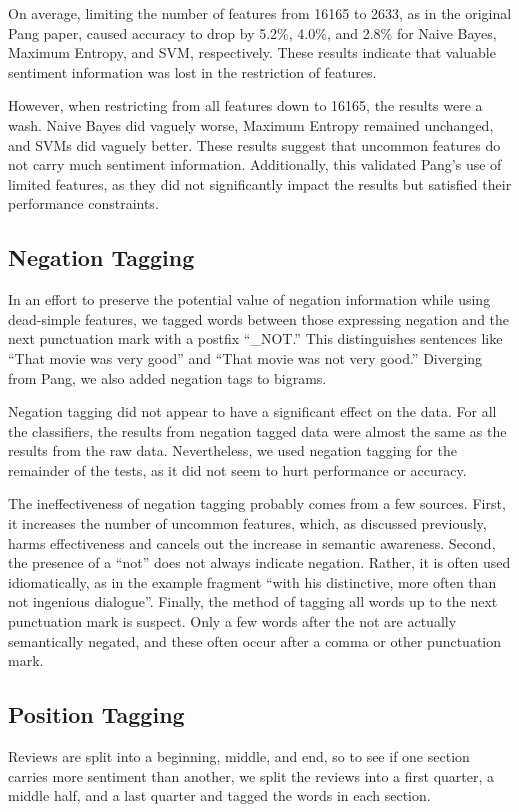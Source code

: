 \documentclass[10pt,twocolumn,letterpaper]{article}
\begin{document}
On average, limiting the number of features from 16165 to 2633, as in the original Pang paper, caused accuracy to drop by 5.2\%, 4.0\%, and 2.8\% for Naive Bayes, Maximum Entropy, and SVM, respectively. These results indicate that valuable sentiment information was lost in the restriction of features. 

However, when restricting from all features down to 16165, the results were a wash. Naive Bayes did vaguely worse, Maximum Entropy remained unchanged, and SVMs did vaguely better. These results suggest that uncommon features do not carry much sentiment information. Additionally, this validated Pang's use of limited features, as they did not significantly impact the results but satisfied their performance constraints.

\subsection{Negation Tagging}

In an effort to preserve the potential value of negation information while using dead-simple features, we tagged words between those expressing negation and the next punctuation mark with a postfix ``\_NOT.'' This distinguishes sentences like ``That movie was very good'' and ``That movie was not very good.'' Diverging from Pang, we also added negation tags to bigrams.

Negation tagging did not appear to have a significant effect on the data. For all the classifiers, the results from negation tagged data were almost the same as the results from the raw data. Nevertheless, we used negation tagging for the remainder of the tests, as it did not seem to hurt performance or accuracy. 

The ineffectiveness of negation tagging probably comes from a few sources. First, it increases the number of uncommon features, which, as discussed previously, harms effectiveness and cancels out the increase in semantic awareness. Second, the presence of a “not” does not always indicate negation. Rather, it is often used idiomatically, as in the example fragment ``with his distinctive, more often than not ingenious dialogue''. Finally, the method of tagging all words up to the next punctuation mark is suspect. Only a few words after the not are actually semantically negated, and these often occur after a comma or other punctuation mark.

\subsection{Position Tagging}
Reviews are split into a beginning, middle, and end, so to see if one section carries more sentiment than another, we split the reviews into a first quarter, a middle half, and a last quarter and tagged the words in each section.
\end{document}
